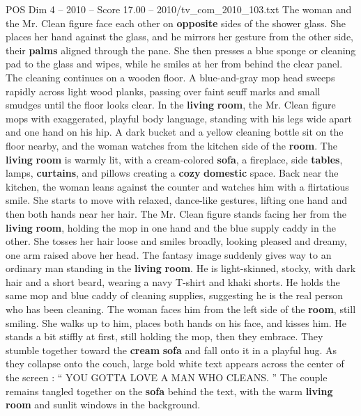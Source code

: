 \begin{textsample}{POS Dim 4 – 2010 – Score 17.00 – 2010/tv\_com\_2010\_103.txt}
The woman and the Mr.
Clean figure face each other on \textbf{opposite} sides of the shower glass.
She places her hand against the glass, and he mirrors her gesture from the other side, their \textbf{palms} aligned through the pane.
She then presses a blue sponge or cleaning pad to the glass and wipes, while he smiles at her from behind the clear panel.
The cleaning continues on a wooden floor.
A blue-and-gray mop head sweeps rapidly across light wood planks, passing over faint scuff marks and small smudges until the floor looks clear.
In the \textbf{living} \textbf{room}, the Mr.
Clean figure mops with exaggerated, playful body language, standing with his legs wide apart and one hand on his hip.
A dark bucket and a yellow cleaning bottle sit on the floor nearby, and the woman watches from the kitchen side of the \textbf{room}.
The \textbf{living} \textbf{room} is warmly lit, with a cream-colored \textbf{sofa}, a fireplace, side \textbf{tables}, lamps, \textbf{curtains}, and pillows creating a \textbf{cozy} \textbf{domestic} space.
Back near the kitchen, the woman leans against the counter and watches him with a flirtatious smile.
She starts to move with relaxed, dance-like gestures, lifting one hand and then both hands near her hair.
The Mr.
Clean figure stands facing her from the \textbf{living} \textbf{room}, holding the mop in one hand and the blue supply caddy in the other.
She tosses her hair loose and smiles broadly, looking pleased and dreamy, one arm raised above her head.
The fantasy image suddenly gives way to an ordinary man standing in the \textbf{living} \textbf{room}.
He is light-skinned, stocky, with dark hair and a short beard, wearing a navy T-shirt and khaki shorts.
He holds the same mop and blue caddy of cleaning supplies, suggesting he is the real person who has been cleaning.
The woman faces him from the left side of the \textbf{room}, still smiling.
She walks up to him, places both hands on his face, and kisses him.
He stands a bit stiffly at first, still holding the mop, then they embrace.
They stumble together toward the \textbf{cream} \textbf{sofa} and fall onto it in a playful hug.
As they collapse onto the couch, large bold white text appears across the center of the screen : “ YOU GOTTA LOVE A MAN WHO CLEANS. ” The couple remains tangled together on the \textbf{sofa} behind the text, with the warm \textbf{living} \textbf{room} and sunlit windows in the background.

\end{textsample}
